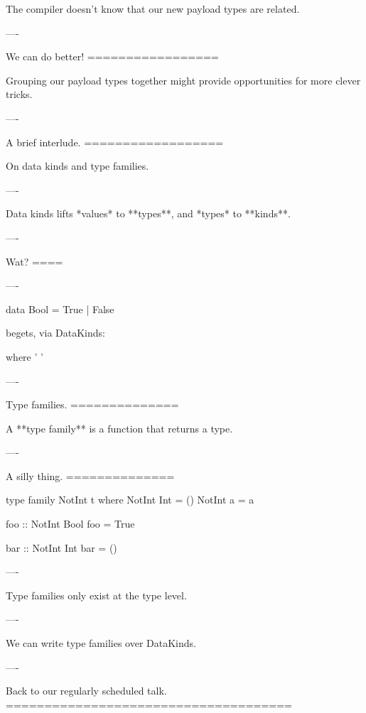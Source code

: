 The compiler doesn't know that our new payload types are related.

----

We can do better!
=================

Grouping our payload types together might provide opportunities for more clever tricks.

----

A brief interlude.
==================

On data kinds and type families.

----

Data kinds lifts *values* to **types**, and *types* to **kinds**.

----

Wat?
====

----

\begin{hs}
  data Bool = True
            | False
\end{hs}

\begin{raw}
\end{raw}


begets, via DataKinds:

\begin{custom}

    where
     '
     '
\end{custom}

----

Type families.
==============

A **type family** is a function that returns a type.

----

A silly thing.
==============

\begin{hs}
  type family NotInt t where
    NotInt Int = ()
    NotInt a   = a

  foo :: NotInt Bool
  foo = True

  bar :: NotInt Int
  bar = ()
\end{hs}

----

Type families only exist at the type level.

----

We can write type families over DataKinds.

----

Back to our regularly scheduled talk.
=====================================


